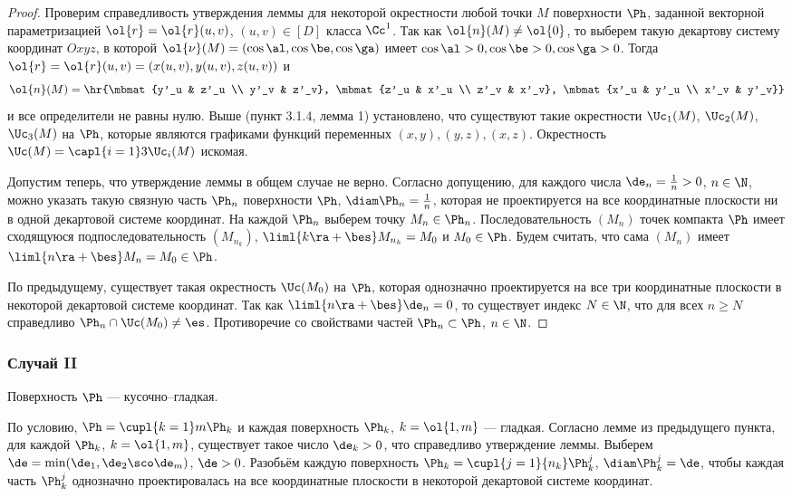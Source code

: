 \documentclass[a4paper]{article}
\begin{document}
\begin{proof}
Проверим справедливость утверждения леммы для некоторой окрестности
любой точки $M$ поверхности $\Ph$, заданной векторной
параметризацией $\ol{r}=\ol{r}(u,v)$, $(u,v)\in[D]$ класса $\Cc^1$.
Так как $\ol{n}(M)\ne\ol{0}$, то выберем такую декартову систему
координат $Oxyz$, в которой $\ol{\nu}(M)=(\cos\al,\cos\be,\cos\ga)$
имеет $\cos\al>0,\cos\be>0,\cos\ga>0$. Тогда $\ol{r}=\ol{r}(u,v) =
(x(u,v),y(u,v),z(u,v))$ и $$\ol{n}(M) = \hr{\mbmat{y'_u & z'_u \\
y'_v & z'_v}, \mbmat{z'_u & x'_u \\ z'_v & x'_v}, \mbmat{x'_u & y'_u
\\ x'_v & y'_v}}$$ и все определители не равны нулю. Выше (пункт
3.1.4, лемма 1) установлено, что существуют такие окрестности
$\Uc_1(M)$, $\Uc_2(M)$, $\Uc_3(M)$ на $\Ph$, которые являются
графиками функций переменных $(x,y), (y,z), (x,z)$. Окрестность
$\Uc(M)=\capl{i=1}3 \Uc_i(M)$ искомая.

Допустим теперь, что утверждение леммы в общем случае не верно.
Согласно допущению, для каждого числа $\de_n=\frac1n>0$, $n\in\N$,
можно указать такую связную часть $\Ph_n$ поверхности $\Ph$,
$\diam\Ph_n=\frac1n$, которая не проектируется на все координатные
плоскости ни в одной декартовой системе координат. На каждой $\Ph_n$
выберем точку $M_n\in\Ph_n$. Последовательность $(M_n)$ точек
компакта $\Ph$ имеет сходящуюся подпоследовательность $(M_{n_k})$,
$\liml{k\ra+\bes} M_{n_k}=M_0$ и $M_0\in\Ph$. Будем считать, что
сама $(M_n)$ имеет $\liml{n\ra+\bes}M_n=M_0\in\Ph$.

По предыдущему, существует такая окрестность $\Uc(M_0)$ на $\Ph$,
которая однозначно проектируется на все три координатные плоскости в
некоторой декартовой системе координат. Так как
$\liml{n\ra+\bes}\de_n=0$, то существует индекс $N\in\N$, что для
всех $n\ge N$ справедливо $\Ph_n\cap\Uc(M_0)\ne\es$. Противоречие со
свойствами частей $\Ph_n\subset\Ph$, $n\in\N$.
\end{proof}

\subsubsection{Случай II}
Поверхность $\Ph$ --- кусочно--гладкая.

По условию, $\Ph=\cupl{k=1}m \Ph_k$ и каждая поверхность $\Ph_k$,
$k=\ol{1,m}$ --- гладкая. Согласно лемме из предыдущего пункта, для
каждой $\Ph_k$, $k=\ol{1,m}$, существует такое число $\de_k>0$, что
справедливо утверждение леммы. Выберем
$\de=\min(\de_1,\de_2\sco\de_m)$, $\de>0$. Разобьём каждую
поверхность $\Ph_k=\cupl{j=1}{n_k} \Ph^j_k$, $\diam\Ph^j_k=\de$,
чтобы каждая часть $\Ph^j_k$ однозначно проектировалась на все
координатные плоскости в некоторой декартовой системе координат.
\end{document}
